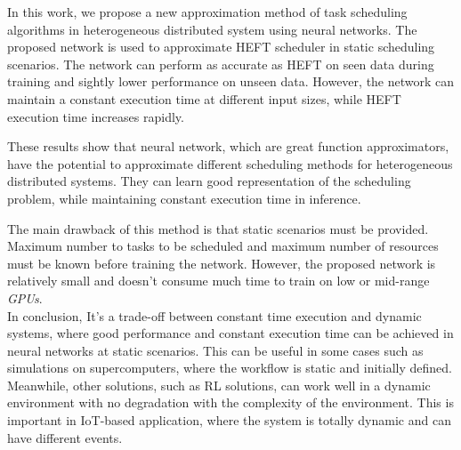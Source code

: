 In this work, we propose a new approximation method of task scheduling algorithms in heterogeneous distributed system using neural networks. The proposed network is used to approximate HEFT scheduler in static scheduling scenarios. The network can perform as accurate as HEFT on seen data during training and sightly lower performance on unseen data. However, the network can maintain a constant execution time at different input sizes, while HEFT execution time increases rapidly. 

These results show that neural network, which are great function approximators, have the potential to approximate different scheduling methods for heterogeneous distributed systems. They can learn good representation of the scheduling problem, while maintaining constant execution time in inference. 

The main drawback of this method is that static scenarios must be provided. Maximum number to tasks to be scheduled and maximum number of resources must be known before training the network. However, the proposed network is relatively small and doesn't consume much time to train on low or mid-range \emph{GPUs}. \\

In conclusion, It's a trade-off between constant time execution and dynamic systems, where good performance and constant execution time can be achieved in neural networks at static scenarios. This can be useful in some cases such as simulations on supercomputers, where the workflow is static and initially defined. Meanwhile, other solutions, such as RL solutions, can work well in a dynamic environment with no degradation with the complexity of the environment. This is important in IoT-based application, where the system is totally dynamic and can have different events.